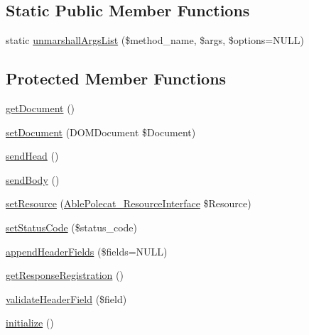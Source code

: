 \subsection*{Static Public Member Functions}
\begin{DoxyCompactItemize}
\item 
static \hyperlink{class_able_polecat___message___response_abstract_a94d2e558bba777f54dcc10f1bfc4dca5}{unmarshall\+Args\+List} (\$method\+\_\+name, \$args, \$options=N\+U\+L\+L)
\end{DoxyCompactItemize}
\subsection*{Protected Member Functions}
\begin{DoxyCompactItemize}
\item 
\hyperlink{class_able_polecat___message___response_abstract_a2a238eb37625dec8b40d857cdbccb582}{get\+Document} ()
\item 
\hyperlink{class_able_polecat___message___response_abstract_a41defc92c9ab623c08091fb4e78c764c}{set\+Document} (D\+O\+M\+Document \$Document)
\item 
\hyperlink{class_able_polecat___message___response_abstract_a9fbf1cb2098810d8b43b4f7d68f64bfc}{send\+Head} ()
\item 
\hyperlink{class_able_polecat___message___response_abstract_a18c9edb23abddbba27fdd4348218461f}{send\+Body} ()
\item 
\hyperlink{class_able_polecat___message___response_abstract_aef44c5c487dd03d03a69b0c8c4bca909}{set\+Resource} (\hyperlink{interface_able_polecat___resource_interface}{Able\+Polecat\+\_\+\+Resource\+Interface} \$Resource)
\item 
\hyperlink{class_able_polecat___message___response_abstract_a8e562a4ffea53168c9f315d53591b4e6}{set\+Status\+Code} (\$status\+\_\+code)
\item 
\hyperlink{class_able_polecat___message___response_abstract_a32a94d62ea31bf844209341d9d6c2463}{append\+Header\+Fields} (\$fields=N\+U\+L\+L)
\item 
\hyperlink{class_able_polecat___message___response_abstract_aca5260cc789780f63a919a2d094c74ce}{get\+Response\+Registration} ()
\item 
\hyperlink{class_able_polecat___message___response_abstract_a1211a3dcd44d6bfe7f0205151465a677}{validate\+Header\+Field} (\$field)
\item 
\hyperlink{class_able_polecat___message___response_abstract_a91098fa7d1917ce4833f284bbef12627}{initialize} ()
\end{DoxyCompactItemize}
